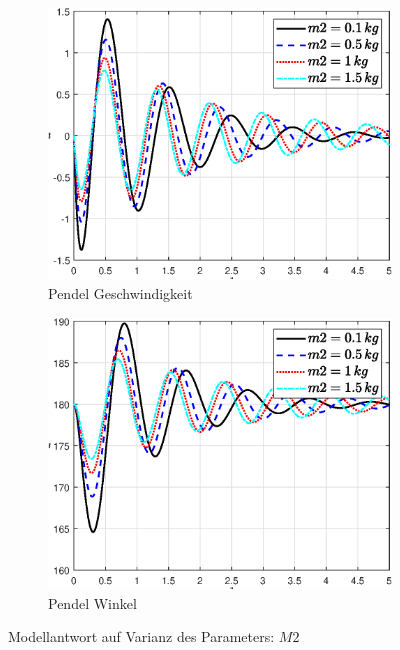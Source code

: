 \begin{figure}
\begin{subfigure}[b]{0.49\linewidth}
        \label{fig:m2_tau}
    \end{subfigure}
    \begin{subfigure}[b]{0.49\linewidth}
        \includegraphics[width=\linewidth]{plot_data/parameter/fig/m2/theta_punkt.eps}
        \caption{Pendel Geschwindigkeit}
        \label{fig:m2_theta_punkt}      
    \end{subfigure}
    \begin{subfigure}[b]{0.49\linewidth}
        \includegraphics[width=\linewidth]{plot_data/parameter/fig/m2/theta.eps}
        \caption{Pendel Winkel}
        \label{fig:m2_theta}
    \end{subfigure}
        \caption{Modellantwort auf Varianz des Parameters: $M2$}
        \label{fig:m2}
\end{figure}

